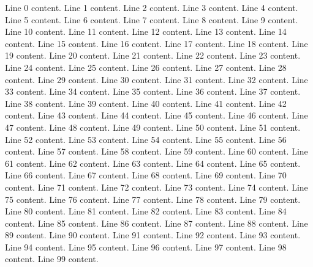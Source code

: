 Line 0 content.
Line 1 content.
Line 2 content.
Line 3 content.
Line 4 content.
Line 5 content.
Line 6 content.
Line 7 content.
Line 8 content.
Line 9 content.
Line 10 content.
Line 11 content.
Line 12 content.
Line 13 content.
Line 14 content.
Line 15 content.
Line 16 content.
Line 17 content.
Line 18 content.
Line 19 content.
Line 20 content.
Line 21 content.
Line 22 content.
Line 23 content.
Line 24 content.
Line 25 content.
Line 26 content.
Line 27 content.
Line 28 content.
Line 29 content.
Line 30 content.
Line 31 content.
Line 32 content.
Line 33 content.
Line 34 content.
Line 35 content.
Line 36 content.
Line 37 content.
Line 38 content.
Line 39 content.
Line 40 content.
Line 41 content.
Line 42 content.
Line 43 content.
Line 44 content.
Line 45 content.
Line 46 content.
Line 47 content.
Line 48 content.
Line 49 content.
Line 50 content.
Line 51 content.
Line 52 content.
Line 53 content.
Line 54 content.
Line 55 content.
Line 56 content.
Line 57 content.
Line 58 content.
Line 59 content.
Line 60 content.
Line 61 content.
Line 62 content.
Line 63 content.
Line 64 content.
Line 65 content.
Line 66 content.
Line 67 content.
Line 68 content.
Line 69 content.
Line 70 content.
Line 71 content.
Line 72 content.
Line 73 content.
Line 74 content.
Line 75 content.
Line 76 content.
Line 77 content.
Line 78 content.
Line 79 content.
Line 80 content.
Line 81 content.
Line 82 content.
Line 83 content.
Line 84 content.
Line 85 content.
Line 86 content.
Line 87 content.
Line 88 content.
Line 89 content.
Line 90 content.
Line 91 content.
Line 92 content.
Line 93 content.
Line 94 content.
Line 95 content.
Line 96 content.
Line 97 content.
Line 98 content.
Line 99 content.